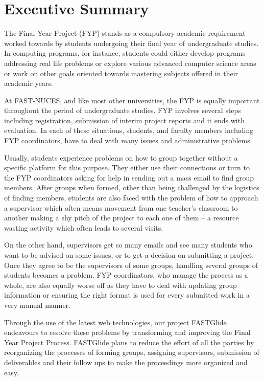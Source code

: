 \documentclass{FastFyp}
\begin{document}
\section*{Executive Summary}
The Final Year Project (FYP) stands as a compulsory academic requirement worked towards by students undergoing their final year of undergraduate studies. In computing programs, for instance, students could either develop programs addressing real life problems or explore various advanced computer science areas or work on other goals oriented towards mastering subjects offered in their academic years.

At FAST-NUCES, and like most other universities, the FYP is equally important throughout the period of undergraduate studies. FYP involves several steps including registration, submission of interim project reports and it ends with evaluation. In each of these situations, students, and faculty members including FYP coordinators, have to deal with many issues and administrative problems.

Usually, students experience problems on how to group together without a specific platform for this purpose. They either use their connections or turn to the FYP coordinators asking for help in sending out a mass email to find group members. After groups when formed, other than being challenged by the logistics of finding members, students are also faced with the problem of how to approach a supervisor which often means movement from one teacher’s classroom to another making a shy pitch of the project to each one of them – a resource wasting activity which often leads to several visits.

On the other hand, supervisors get so many emails and see many students who want to be advised on some issues, or to get a decision on submitting a project. Once they agree to be the supervisors of some groups, handling several groups of students becomes a problem. FYP coordinators, who manage the process as a whole, are also equally worse off as they have to deal with updating group information or ensuring the right format is used for every submitted work in a very manual manner.

Through the use of the latest web technologies, our project FASTGlide endeavours to resolve these problems by transforming and improving the Final Year Project Process. FASTGlide plans to reduce the effort of all the parties by reorganizing the processes of forming groups, assigning supervisors, submission of deliverables and their follow ups to make the proceedings more organized and easy.
\end{document}
